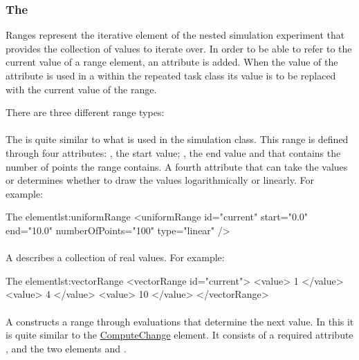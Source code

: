 \subsubsection{ The }
\label{class:ranges}
Ranges represent the iterative element of the nested simulation experiment that provides the collection of values to iterate over. In order to be able to refer to the current value of a range element, an  attribute is added. When the value of the  attribute is used in a  within the repeated task class its value is to be replaced with the current value of the range.

There are three different range types: 

\paragraph{}
\label{class:uniformRange}
The  is quite similar to what is used in the  simulation class. This range is defined through four attributes: , the start value; , the end value and  that contains the number of points the range contains. A fourth attribute  that can take the values  or  determines whether to draw the values logarithmically or linearly.  For example:
\begin{myXmlLst}{The  element}{lst:uniformRange}
    <uniformRange id="current" start="0.0" end="10.0" numberOfPoints="100" type="linear" /> 
\end{myXmlLst}

\paragraph{}
\label{class:vectorRange}
A  describes a collection of real values. For example:
\begin{myXmlLst}{The  element}{lst:vectorRange}
    <vectorRange id="current"> 
        <value> 1 </value> 
        <value> 4 </value> 
        <value> 10 </value> 
    </vectorRange> 
\end{myXmlLst}

\paragraph{}
\label{class:functionalRange}
A  constructs a range through evaluations that determine the next value. In this it is quite similar to the \hyperref[class:computeChange]{ComputeChange} element. It consists of a required attribute , and the two elements  and . 


